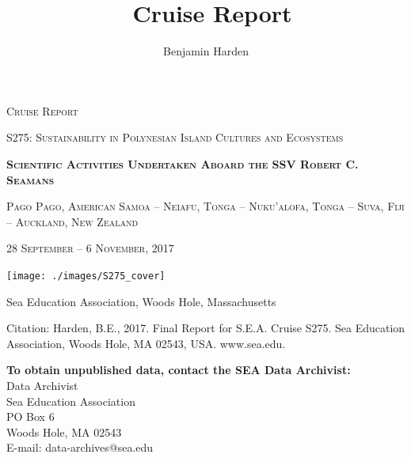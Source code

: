 \documentclass[letterpaper,11pt]{article}
\title{\cruiseID\ Cruise Report}
\author{Benjamin Harden}
\newcommand{\cruiseID}{S275}
\begin{document}
\begin{titlepage}
	\centering
        \vspace*{.3cm}
	{\scshape\LARGE Cruise Report \par}
	{\scshape\Large \cruiseID : Sustainability in Polynesian Island Cultures and Ecosystems \par}
	\vspace{1.5cm}
	{\scshape\huge\bfseries Scientific Activities Undertaken Aboard the SSV Robert C. Seamans\par}
	\vspace{1cm}
        {\scshape\Large Pago Pago, American Samoa -- Neiafu, Tonga -- Nuku'alofa, Tonga -- Suva, Fiji -- Auckland, New Zealand \par}
        {\scshape\large 28  September -- 6 November, 2017\par}
        \vspace{1cm}        
        \texttt{[image: ./images/S275\_cover]}\par
        \vspace{1cm}
	\large Sea Education Association, Woods Hole, Massachusetts
	\vfill
\end{titlepage}


\vspace*{\fill}
\noindent Citation: Harden, B.E., 2017. Final Report for S.E.A. Cruise \cruiseID . Sea Education Association, Woods Hole, MA 02543, USA. www.sea.edu.

\noindent\textbf{To obtain unpublished data, contact the SEA Data Archivist:}\\
Data Archivist\\
Sea Education Association\\
PO Box 6\\
Woods Hole, MA 02543\\
E-mail: data-archives@sea.edu\\

\clearpage
\listoffigures
\listoftables
\clearpage
\end{document}
